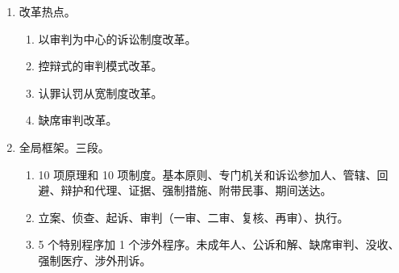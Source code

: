 \begin{enumerate}
\begin{enumerate}
\begin{enumerate}
\begin{enumerate}
                        \end{enumerate}
                  \item 未成年人犯罪记录封存的实施办法。
                \end{enumerate}
        \end{enumerate}
  \item 改革热点。
        \begin{enumerate}
          \item 以审判为中心的诉讼制度改革。
          \item 控辩式的审判模式改革。
          \item 认罪认罚从宽制度改革。
          \item 缺席审判改革。
        \end{enumerate}
  \item 全局框架。三段。
        \begin{enumerate}
          \item 10 项原理和 10 项制度。基本原则、专门机关和诉讼参加人、管辖、回避、辩护和代理、证据、强制措施、附带民事、期间送达。
          \item 立案、侦查、起诉、审判（一审、二审、复核、再审）、执行。
          \item 5 个特别程序加 1 个涉外程序。未成年人、公诉和解、缺席审判、没收、强制医疗、涉外刑诉。
        \end{enumerate}
\end{enumerate}
